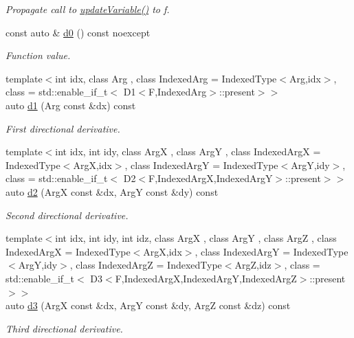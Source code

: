 \begin{DoxyCompactItemize}
\begin{DoxyCompactList}\small\item\em Propagate call to \hyperlink{structFunG_1_1MathematicalOperations_1_1Scale_a5241be9984371f5cf5890d670ae6ed93}{update\-Variable()} to f. \end{DoxyCompactList}\item 
\hypertarget{structFunG_1_1MathematicalOperations_1_1Scale_ae49c1126f8dbc9d3b03e6890392b86ea}{const auto \& \hyperlink{structFunG_1_1MathematicalOperations_1_1Scale_ae49c1126f8dbc9d3b03e6890392b86ea}{d0} () const noexcept}\label{structFunG_1_1MathematicalOperations_1_1Scale_ae49c1126f8dbc9d3b03e6890392b86ea}

\begin{DoxyCompactList}\small\item\em Function value. \end{DoxyCompactList}\item 
{\footnotesize template$<$int idx, class Arg , class Indexed\-Arg  = Indexed\-Type$<$\-Arg,idx$>$, class  = std\-::enable\-\_\-if\-\_\-t$<$ D1$<$\-F,\-Indexed\-Arg$>$\-::present$>$$>$ }\\auto \hyperlink{structFunG_1_1MathematicalOperations_1_1Scale_a63b6f3353439de0125836020bd2b15ba}{d1} (Arg const \&dx) const 
\begin{DoxyCompactList}\small\item\em First directional derivative. \end{DoxyCompactList}\item 
{\footnotesize template$<$int idx, int idy, class Arg\-X , class Arg\-Y , class Indexed\-Arg\-X  = Indexed\-Type$<$\-Arg\-X,idx$>$, class Indexed\-Arg\-Y  = Indexed\-Type$<$\-Arg\-Y,idy$>$, class  = std\-::enable\-\_\-if\-\_\-t$<$ D2$<$\-F,\-Indexed\-Arg\-X,\-Indexed\-Arg\-Y$>$\-::present$>$$>$ }\\auto \hyperlink{structFunG_1_1MathematicalOperations_1_1Scale_a79be0256e8b2b28c32dbcc9d3c098909}{d2} (Arg\-X const \&dx, Arg\-Y const \&dy) const 
\begin{DoxyCompactList}\small\item\em Second directional derivative. \end{DoxyCompactList}\item 
{\footnotesize template$<$int idx, int idy, int idz, class Arg\-X , class Arg\-Y , class Arg\-Z , class Indexed\-Arg\-X  = Indexed\-Type$<$\-Arg\-X,idx$>$, class Indexed\-Arg\-Y  = Indexed\-Type$<$\-Arg\-Y,idy$>$, class Indexed\-Arg\-Z  = Indexed\-Type$<$\-Arg\-Z,idz$>$, class  = std\-::enable\-\_\-if\-\_\-t$<$ D3$<$\-F,\-Indexed\-Arg\-X,\-Indexed\-Arg\-Y,\-Indexed\-Arg\-Z$>$\-::present $>$$>$ }\\auto \hyperlink{structFunG_1_1MathematicalOperations_1_1Scale_a8cb9d13e8bd87c2d4657ae1c075e7f39}{d3} (Arg\-X const \&dx, Arg\-Y const \&dy, Arg\-Z const \&dz) const 
\begin{DoxyCompactList}\small\item\em Third directional derivative. \end{DoxyCompactList}\end{DoxyCompactItemize}


